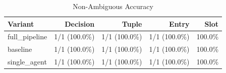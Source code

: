 \begin{table}[htbp]
\centering
\caption{Non-Ambiguous Accuracy}
\label{tab:acc-non-ambig}
\begin{tabular}{l rrrr}
\toprule
Variant & Decision & Tuple & Entry & Slot \\
\midrule
  full\_pipeline & 1/1 (100.0\%) & 1/1 (100.0\%) & 1/1 (100.0\%) & 100.0\% \\
  baseline & 1/1 (100.0\%) & 1/1 (100.0\%) & 1/1 (100.0\%) & 100.0\% \\
  single\_agent & 1/1 (100.0\%) & 1/1 (100.0\%) & 1/1 (100.0\%) & 100.0\% \\
\bottomrule
\end{tabular}
\end{table}

